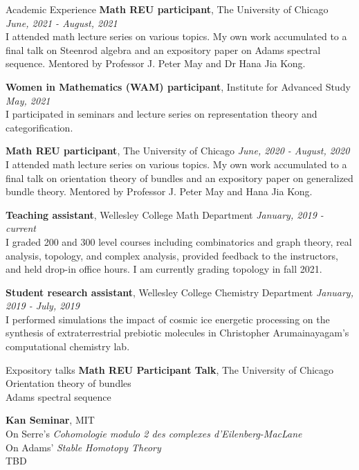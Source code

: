 \documentclass{resume}
\begin{document}
\begin{rSection}{Academic Experience}
{\bf Math REU participant}{, The University of Chicago} \hfill {\em June, 2021 - August, 2021}\\
I attended math lecture series on various topics.  My own work accumulated to a final talk on Steenrod algebra and an expository paper on Adams spectral sequence. Mentored by Professor J. Peter May and Dr Hana Jia Kong.

{\bf Women in Mathematics (WAM) participant}{, Institute for Advanced Study} \hfill {\em May, 2021}\\
I participated in seminars and lecture series on representation theory and categorification. 

{\bf Math REU participant}{, The University of Chicago} \hfill {\em June, 2020 - August, 2020}\\
I attended math lecture series on various topics.  My own work accumulated to a final talk on orientation theory of bundles and an expository paper on generalized bundle theory. Mentored by Professor J. Peter May and Hana Jia Kong.

{\bf Teaching assistant}{, Wellesley College Math Department} \hfill {\em January, 2019 - current}\\
I graded 200 and 300 level courses including combinatorics and graph theory, real analysis, topology, and complex analysis, provided feedback to the instructors, and held drop-in office hours. I am currently grading topology in fall 2021.

{\bf Student research assistant}{, Wellesley College Chemistry Department} \hfill {\em January, 2019 - July, 2019}\\
I performed simulations the impact of cosmic ice energetic processing on the synthesis of extraterrestrial prebiotic molecules in Christopher Arumainayagam’s computational chemistry lab.\\
\end{rSection}




\begin{rSection}{Expository talks}
{\bf Math REU Participant Talk}{, The University of Chicago}
\\Orientation theory of bundles 
\\Adams spectral sequence 

{\bf Kan Seminar}{, MIT}
\\ On Serre's \textit{Cohomologie modulo 2 des complexes d’Eilenberg-MacLane} 
\\On Adams' \textit{Stable Homotopy Theory} 
\\TBD {}\\
\end{rSection}
\end{document}
